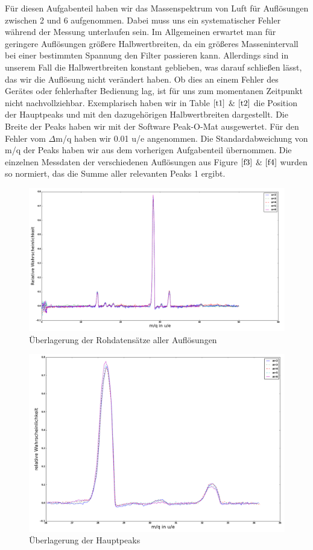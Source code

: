 \documentclass[10pt,a4paper]{article}
\begin{document}
Für diesen Aufgabenteil haben wir das Massenspektrum von Luft für Auflösungen zwischen 2 und 6 aufgenommen. Dabei muss uns ein systematischer Fehler während der Messung unterlaufen sein. Im Allgemeinen erwartet man für geringere Auflösungen größere Halbwertbreiten, da ein größeres Massenintervall bei einer bestimmten Spannung den Filter passieren kann. Allerdings sind in unserem Fall die Halbwertbreiten konstant geblieben, was darauf schließen lässt, das wir die Auflösung nicht verändert haben. Ob dies an einem Fehler des Gerätes oder fehlerhafter Bedienung lag, ist für uns zum momentanen Zeitpunkt nicht nachvollziehbar. Exemplarisch haben wir in Table $\ref{t1}$  $\&$ $\ref{t2}$  die Position der Hauptpeaks und mit den dazugehörigen Halbwertbreiten dargestellt. Die Breite der Peaks haben wir mit der Software Peak-O-Mat ausgewertet. Für den Fehler vom $\Delta$m/q haben wir 0.01 u/e angenommen. Die Standardabweichung von m/q der Peaks haben wir aus dem vorherigen Aufgabenteil übernommen. Die einzelnen Messdaten der verschiedenen Auflösungen aus Figure $\ref{f3}$  $\&$ $\ref{f4}$ wurden so normiert, das die Summe aller relevanten Peaks 1 ergibt.
\begin{figure}[h]
	\includegraphics[scale = 0.5]{alleres.png}
	\centering
	\caption{Überlagerung der Rohdatensätze aller Auflösungen}
	\label{f3}
\end{figure}
\begin{figure}[h]
	\includegraphics[scale = 0.5]{zweipeaks.png}
	\centering
	\caption{Überlagerung der Hauptpeaks}
	\label{f4}
\end{figure}
\end{document}
